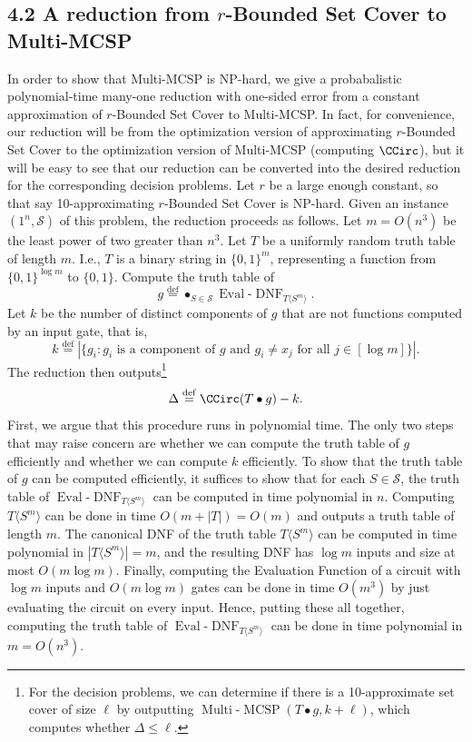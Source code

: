 \subsection*{4.2 A reduction from $r$-Bounded Set Cover to Multi-MCSP}
In order to show that Multi-MCSP is NP-hard, we give a probabalistic polynomial-time many-one reduction with one-sided error from a constant approximation of $r$-Bounded Set Cover to Multi-MCSP.
In fact, for convenience, our reduction will be from the optimization version of approximating $r$-Bounded Set Cover to the optimization version of Multi-MCSP (computing $\CCirc$), but it will be easy to see that our reduction can be converted into the desired reduction for the corresponding decision problems.
Let $r$ be a large enough constant, so that say 10-approximating $r$-Bounded Set Cover is NP-hard. Given an instance $(1^n,\mathcal S)$ of this problem, the reduction proceeds as follows. Let $m=O(n^3)$ be the least power of two greater than $n^3$. Let $T$ be a uniformly random truth table of length $m$. I.e., $T$ is a binary string in $\{0,1\}^m$, representing a function from $\{0,1\}^{\log m}$ to $\{0,1\}$. Compute the truth table of
\[g\stackrel{\mathrm{def}}=\mathop{\bullet}_{S\in\mathcal S}\operatorname{Eval}\text{-}\operatorname{DNF}_{T\langle S^m\rangle}.\]
Let $k$ be the number of distinct components of $g$ that are not functions computed by an input gate, that is,
\[k\stackrel{\mathrm{def}}=|\{g_i:g_i\text{ is a component of }g\text{ and }g_i\ne x_j\text{ for all }j\in[\log m]\}|.\]
The reduction then outputs\footnote{For the decision problems, we can determine if there is a 10-approximate set cover of size $\ell$ by outputting $\operatorname{Multi}\text{-}\operatorname{MCSP}(T\bullet g,k+\ell)$, which computes whether $\Delta\leq\ell$.}
\[\Delta\stackrel{\mathrm{def}}=\CCirc(T\bullet g)-k.\]
First, we argue that this procedure runs in polynomial time. The only two steps that may raise concern are whether we can compute the truth table of $g$ efficiently and whether we can compute $k$ efficiently.
To show that the truth table of $g$ can be computed efficiently, it suffices to show that for each $S\in\mathcal S$, the truth table of $\operatorname{Eval}\text{-}\operatorname{DNF}_{T\langle S^m\rangle}$ can be computed in time polynomial in $n$. Computing $T\langle S^m\rangle$ can be done in time $O(m+|T|)=O(m)$ and outputs a truth table of length $m$. The canonical DNF of the truth table $T\langle S^m\rangle$ can be computed in time polynomial in $|T\langle S^m\rangle|=m$, and the resulting DNF has $\log m$ inputs and size at most $O(m\log m)$. Finally, computing the Evaluation Function of a circuit with $\log m$ inputs and $O(m\log m)$ gates can be done in time $O(m^3)$ by just evaluating the circuit on every input. Hence, putting these all together, computing the truth table of $\operatorname{Eval}\text{-}\operatorname{DNF}_{T\langle S^m\rangle}$ can be done in time polynomial in $m=O(n^3)$.
